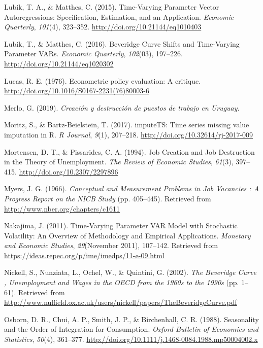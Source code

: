 \documentclass[12pt,oneside]{reedthesis}
\begin{document}
\leavevmode\hypertarget{ref-Lubik2016b}{}%
Lubik, T. A., \& Matthes, C. (2015). Time-Varying Parameter Vector Autoregressions: Specification, Estimation, and an Application. \emph{Economic Quarterly}, \emph{101}(4), 323--352. \url{http://doi.org/10.21144/eq1010403}

\leavevmode\hypertarget{ref-Lubik2016}{}%
Lubik, T., \& Matthes, C. (2016). Beveridge Curve Shifts and Time-Varying Parameter VARs. \emph{Economic Quarterly}, \emph{102}(03), 197--226. \url{http://doi.org/10.21144/eq1020302}

\leavevmode\hypertarget{ref-Lucas1976}{}%
Lucas, R. E. (1976). Econometric policy evaluation: A critique. \url{http://doi.org/10.1016/S0167-2231(76)80003-6}

\leavevmode\hypertarget{ref-Merlo2019}{}%
Merlo, G. (2019). \emph{Creación y destrucción de puestos de trabajo en Uruguay}.

\leavevmode\hypertarget{ref-Moritz2017}{}%
Moritz, S., \& Bartz-Beielstein, T. (2017). imputeTS: Time series missing value imputation in R. \emph{R Journal}, \emph{9}(1), 207--218. \url{http://doi.org/10.32614/rj-2017-009}

\leavevmode\hypertarget{ref-Mortensen1994}{}%
Mortensen, D. T., \& Pissarides, C. A. (1994). Job Creation and Job Destruction in the Theory of Unemployment. \emph{The Review of Economic Studies}, \emph{61}(3), 397--415. \url{http://doi.org/10.2307/2297896}

\leavevmode\hypertarget{ref-Myers1966}{}%
Myers, J. G. (1966). \emph{Conceptual and Measurement Problems in Job Vacancies : A Progress Report on the NICB Study} (pp. 405--445). Retrieved from \url{http://www.nber.org/chapters/c1611}

\leavevmode\hypertarget{ref-Nakajima2011}{}%
Nakajima, J. (2011). Time-Varying Parameter VAR Model with Stochastic Volatility: An Overview of Methodology and Empirical Applications. \emph{Monetary and Economic Studies}, \emph{29}(November 2011), 107--142. Retrieved from \url{https://ideas.repec.org/p/ime/imedps/11-e-09.html}

\leavevmode\hypertarget{ref-Nickell2002}{}%
Nickell, S., Nunziata, L., Ochel, W., \& Quintini, G. (2002). \emph{The Beveridge Curve , Unemployment and Wages in the OECD from the 1960s to the 1990s} (pp. 1--61). Retrieved from \url{http://www.nuffield.ox.ac.uk/users/nickell/papers/TheBeveridgeCurve.pdf}

\leavevmode\hypertarget{ref-Osborn1988}{}%
Osborn, D. R., Chui, A. P., Smith, J. P., \& Birchenhall, C. R. (1988). Seasonality and the Order of Integration for Consumption. \emph{Oxford Bulletin of Economics and Statistics}, \emph{50}(4), 361--377. \url{http://doi.org/10.1111/j.1468-0084.1988.mp50004002.x}
\end{document}
